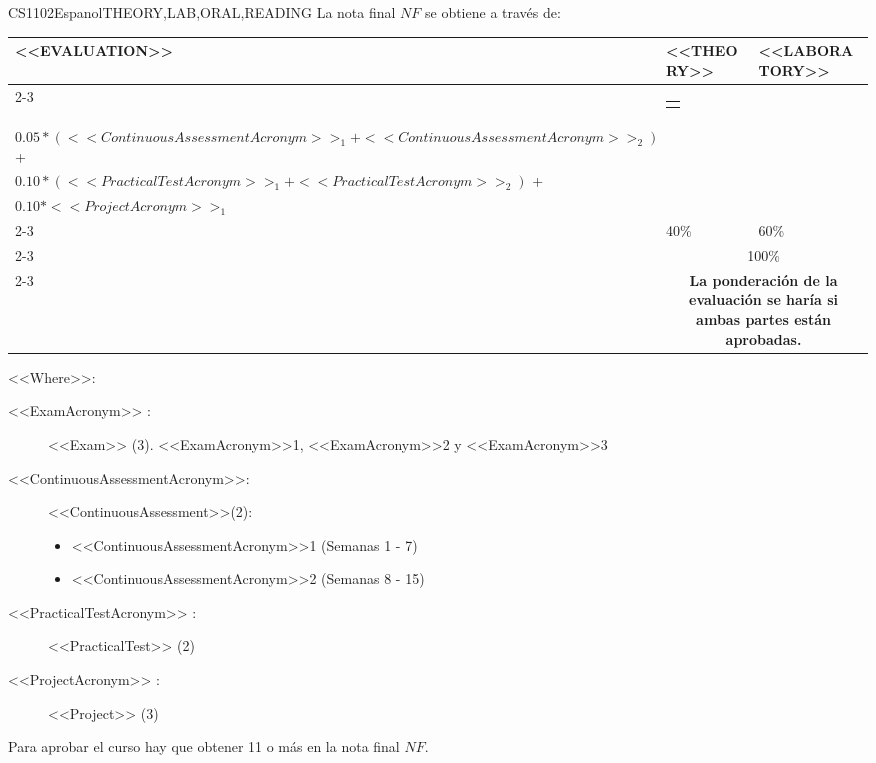   \begin{evaluation}{CS1102}{Espanol}{THEORY,LAB,ORAL,READING}
  La nota final $NF$ se obtiene a través de: \\
 
  \begin{tabularx}{0.9\textwidth}{|X|p{}|p{}|} \hline
  \multirow{4}{*}{\uppercase{<<Evaluation>>}} & \uppercase{<<Theory>>} & \uppercase{<<Laboratory>>} \\ \cline{2-3}
  & %
      \begin{minipage}{0.95\textwidth}
      \begin{tabular}{l}
          $0.40*<<ExamAcronym>>_{1}$
          \end{tabular} 
      \end{minipage} 
  & %
      \begin{minipage}{0.95\textwidth}
      \begin{tabular}{l}
        $0.10*(<<ExamAcronym>>_{2} + <<ExamAcronym>>_{3})$ + \\
        $0.05*(<<ContinuousAssessmentAcronym>>_{1} + <<ContinuousAssessmentAcronym>>_{2})$ + \\
        $0.10*(<<PracticalTestAcronym>>_{1} + <<PracticalTestAcronym>>_{2})$ + \\
        $0.10*<<ProjectAcronym>>_{1}$
      \end{tabular} 
      \end{minipage}                 \\ \cline{2-3}
  & %
  40\% 
  & %
  60\% \\ \cline{2-3}
  & \multicolumn{2}{c|}{100\%}  \\ \cline{2-3}
  & \multicolumn{2}{c|}{\textbf{La ponderación de la evaluación se haría si ambas partes están aprobadas.}}  \\ \hline
  \end{tabularx}
    
  \vspace{2mm}
  \noindent <<Where>>:
  \begin{description}
      \item[<<ExamAcronym>> :] <<Exam>> (3). <<ExamAcronym>>1, <<ExamAcronym>>2 y <<ExamAcronym>>3
      \item[<<ContinuousAssessmentAcronym>>:]<<ContinuousAssessment>>(2):
      \begin{itemize}
              \item <<ContinuousAssessmentAcronym>>1 (Semanas 1 - 7) 
              \item <<ContinuousAssessmentAcronym>>2 (Semanas 8 - 15)
      \end{itemize}
      \item[<<PracticalTestAcronym>> :] <<PracticalTest>>  (2)
      \item[<<ProjectAcronym>> :] <<Project>> (3)
  \end{description}
 
  \noindent Para aprobar el curso hay que obtener 11 o más en la nota final $NF$.
  \end{evaluation}
 
